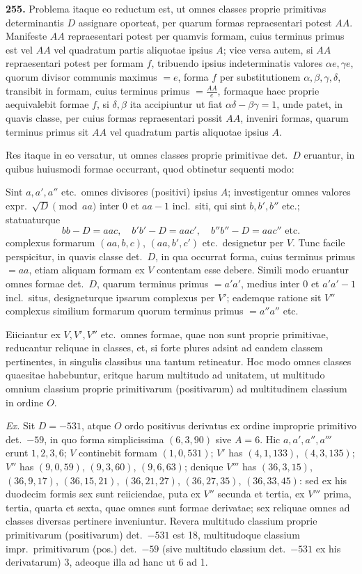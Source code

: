 \documentclass[12pt,a4paper]{article}
\theoremstyle{plain}
\theoremstyle{definition}
\theoremstyle{remark}
\theoremstyle{problemstyle}
\begin{document}
\textbf{255.} Problema itaque eo reductum est, ut omnes classes proprie primitivas determinantis $D$ assignare oporteat, per quarum formas repraesentari potest $AA$. Manifeste $AA$ repraesentari potest per quamvis formam, cuius terminus primus est vel $AA$ vel quadratum partis aliquotae ipsius $A$; vice versa autem, si $AA$ repraesentari potest per formam $f$, tribuendo ipsius indeterminatis valores $\alpha e, \gamma e$, quorum divisor communis maximus $= e$, forma $f$ per substitutionem $\alpha, \beta, \gamma, \delta$, transibit in formam, cuius terminus primus $= \frac{AA}{e}$, formaque haec proprie aequivalebit formae $f$, si $\delta, \beta$ ita accipiuntur ut fiat $\alpha\delta - \beta\gamma = 1$, unde patet, in quavis classe, per cuius formas repraesentari possit $AA$, inveniri formas, quarum terminus primus sit $AA$ vel quadratum partis aliquotae ipsius $A$.

Res itaque in eo versatur, ut omnes classes proprie primitivae det.\ $D$ eruantur, in quibus huiusmodi formae occurrant, quod obtinetur sequenti modo:

Sint $a, a', a''$ etc.\ omnes divisores (positivi) ipsius $A$; investigentur omnes valores expr.\ $\sqrt{D} \pmod{aa}$ inter $0$ et $aa - 1$ incl.\ siti, qui sint $b, b', b''$ etc.; statuaturque
\[
bb - D = aac, \quad b'b' - D = aac', \quad b''b'' - D = aac'' \text{ etc.}
\]
complexus formarum $(aa, b, c)$, $(aa, b', c')$ etc.\ designetur per $V$. Tunc facile perspicitur, in quavis classe det.\ $D$, in qua occurrat forma, cuius terminus primus $= aa$, etiam aliquam formam ex $V$ contentam esse debere. Simili modo eruantur omnes formae det.\ $D$, quarum terminus primus $= a'a'$, medius inter $0$ et $a'a' - 1$ incl.\ situs, designeturque ipsarum complexus per $V'$; eademque ratione sit $V''$ complexus similium formarum quorum terminus primus $= a''a''$ etc.

Eiiciantur ex $V, V', V''$ etc.\ omnes formae, quae non sunt proprie primitivae, reducantur reliquae in classes, et, si forte plures adsint ad eandem classem pertinentes, in singulis classibus una tantum retineatur. Hoc modo omnes classes quaesitae habebuntur, eritque harum multitudo ad unitatem, ut multitudo omnium classium proprie primitivarum (positivarum) ad multitudinem classium in ordine $O$.

\emph{Ex.} Sit $D = -531$, atque $O$ ordo positivus derivatus ex ordine improprie primitivo det.\ $-59$, in quo forma simplicissima $(6, 3, 90)$ sive $A = 6$. Hic $a, a', a'', a'''$ erunt $1, 2, 3, 6$; $V$ continebit formam $(1, 0, 531)$; $V'$ has $(4, 1, 133)$, $(4, 3, 135)$; $V''$ has $(9, 0, 59)$, $(9, 3, 60)$, $(9, 6, 63)$; denique $V'''$ has $(36, 3, 15)$, $(36, 9, 17)$, $(36, 15, 21)$, $(36, 21, 27)$, $(36, 27, 35)$, $(36, 33, 45)$: sed ex his duodecim formis sex sunt reiiciendae, puta ex $V''$ secunda et tertia, ex $V'''$ prima, tertia, quarta et sexta, quae omnes sunt formae derivatae; sex reliquae omnes ad classes diversas pertinere inveniuntur. Revera multitudo classium proprie primitivarum (positivarum) det.\ $-531$ est 18, multitudoque classium impr.\ primitivarum (pos.) det.\ $-59$ (sive multitudo classium det.\ $-531$ ex his derivatarum) 3, adeoque illa ad hanc ut 6 ad 1.
\end{document}
